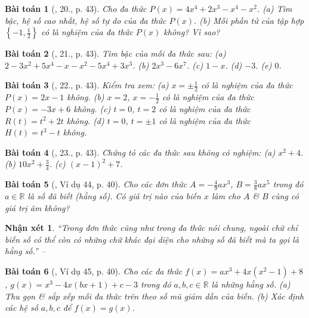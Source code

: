 \documentclass{article}
\newtheorem{baitoan}{Bài toán}
\newtheorem{nhanxet}{Nhận xét}
\begin{document}
\begin{baitoan}[\cite{SBT_Toan_7_Canh_Dieu_tap_2}, 20., p. 43]
	Cho đa thức $P(x) = 4x^4 + 2x^3 - x^4 - x^2$. (a) Tìm bậc, hệ số cao nhất, hệ số tự do của đa thức $P(x)$. (b) Mỗi phần tử của tập hợp $\left\{-1,\frac{1}{2}\right\}$ có là nghiệm của đa thức $P(x)$ không? Vì sao?
\end{baitoan}

\begin{baitoan}[\cite{SBT_Toan_7_Canh_Dieu_tap_2}, 21., p. 43]
	Tìm bậc của mỗi đa thức sau: (a) $2 - 3x^2 + 5x^4 - x - x^2 - 5x^4 + 3x^3$. (b) $2x^3 - 6x^7$. (c) $1 - x$. (d) $-3$. (e) $0$.
\end{baitoan}

\begin{baitoan}[\cite{SBT_Toan_7_Canh_Dieu_tap_2}, 22., p. 43]
	Kiểm tra xem: (a) $x = \pm\frac{1}{2}$ có là nghiệm của đa thức $P(x) = 2x - 1$ không. (b) $x = 2$, $x = -\frac{1}{2}$ có là nghiệm của đa thức $P(x) = -3x + 6$ không. (c) $t = 0$, $t = 2$ có là nghiệm của đa thức $R(t) = t^2 + 2t$ không. (d) $t = 0$, $t = \pm1$ có là nghiệm của đa thức $H(t) = t^3 - t$ không.
\end{baitoan}

\begin{baitoan}[\cite{SBT_Toan_7_Canh_Dieu_tap_2}, 23., p. 43]
	Chứng tỏ các đa thức sau không có nghiệm: (a) $x^2 + 4$. (b) $10x^2 + \frac{3}{4}$. (c) $(x - 1)^2 + 7$.
\end{baitoan}

\begin{baitoan}[\cite{Tuyen_Toan_7}, Ví dụ 44, p. 40]
	Cho các đơn thức $A = -\frac{4}{9}ax^3$, $B = \frac{3}{8}ax^5$ trong đó $a\in\mathbb{R}$ là số đã biết (hằng số). Có giá trị nào của biến $x$ làm cho $A$ \& $B$ cùng có giá trị âm không?
\end{baitoan}

\begin{nhanxet}
	``Trong đơn thức cũng như trong đa thức nói chung, ngoài chữ chỉ biến số có thể còn có những chữ khác đại diện cho những số đã biết mà ta gọi là \emph{hằng số}.'' -- \cite[p. 40]{Tuyen_Toan_7}
\end{nhanxet}

\begin{baitoan}[\cite{Tuyen_Toan_7}, Ví dụ 45, p. 40]
	Cho các đa thức $f(x) = ax^3 + 4x(x^2 - 1) + 8$, $g(x) = x^3 - 4x(bx + 1) + c - 3$ trong đó $a,b,c\in\mathbb{R}$ là những hằng số. (a) Thu gọn \& sắp xếp mỗi đa  thức trên theo số mũ giảm dần của biến. (b) Xác định các hệ số $a,b,c$ để $f(x) = g(x)$.
\end{baitoan}
\end{document}

